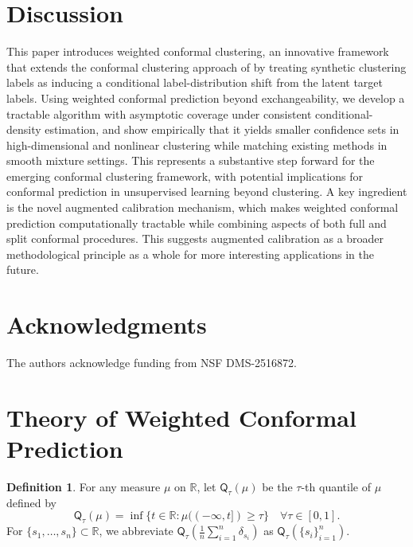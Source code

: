 \documentclass[11pt,letterpaper]{article}
\theoremstyle{definition}
\newtheorem{definition}{Definition}
\newcommand{\R}{\mathbb{R}}
\begin{document}
\section{Discussion}
This paper introduces weighted conformal clustering, an innovative framework that extends the conformal clustering approach of \cite{hur2026inference} by treating synthetic clustering labels as inducing a conditional label-distribution shift from the latent target labels. Using weighted conformal prediction beyond exchangeability, we develop a tractable algorithm with asymptotic coverage under consistent conditional-density estimation, and show empirically that it yields smaller confidence sets in high-dimensional and nonlinear clustering while matching existing methods in smooth mixture settings.
This represents a substantive step forward for the emerging conformal clustering framework, with potential implications for conformal prediction in unsupervised learning beyond clustering. A key ingredient is the novel augmented calibration mechanism, which makes weighted conformal prediction computationally tractable while combining aspects of both full and split conformal procedures. This suggests augmented calibration as a broader methodological principle as a whole for more interesting applications in the future.


\section*{Acknowledgments} 
The authors acknowledge funding from NSF DMS-2516872.







\appendix

\section{Theory of Weighted Conformal Prediction}
\label{appendix:wcp_theory}

\begin{definition}
    \label{def:quantile}
    For any measure $\mu$ on $\R$, let $\mathsf{Q}_\tau(\mu)$ be the $\tau$-th quantile of $\mu$ defined by
    \begin{equation*}
        \mathsf{Q}_\tau(\mu) = \inf\{t \in \R : \mu((-\infty, t]) \ge \tau\} \quad \forall \tau \in [0, 1].
    \end{equation*}
    For $\{s_1, \ldots, s_n\} \subset \R$, we abbreviate $\mathsf{Q}_\tau\left(\frac{1}{n} \sum_{i = 1}^{n} \delta_{s_i}\right)$ as $\mathsf{Q}_\tau(\{s_i\}_{i = 1}^{n})$.
\end{definition}
\end{document}
